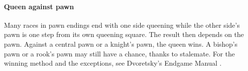
\paragraph{Queen against pawn}
Many races in pawn endings end with one side queening while the other side's pawn is one step
from its own queening square. The result then depends on the pawn. Against a central pawn or a
knight's pawn, the queen wins. A bishop's pawn or a rook's pawn may still have a chance, thanks
to stalemate. For the winning method and the exceptions, see Dvoretsky's Endgame Manual
\cite{Dvoretsky:2008-endgame-manual}.
